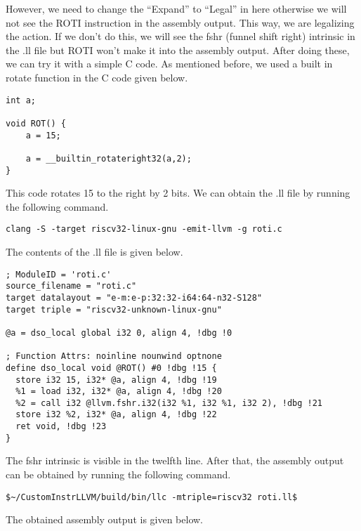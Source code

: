 However, we need to change the “Expand” to “Legal” in here otherwise we will not see the ROTI instruction in the assembly output.  This way, we are legalizing the action. If we don’t do this, we will see the fshr (funnel shift right) intrinsic in the .ll file but ROTI won’t make it into the assembly output. After doing these, we can try it with a simple C code. As mentioned before, we used a built in rotate function in the C code given below. 

\begin{lstlisting}
int a;

void ROT() {
	a = 15;
	
	a = __builtin_rotateright32(a,2);	
}
\end{lstlisting}

This code rotates 15 to the right by 2 bits. We can obtain the .ll file by running the following command.

\begin{lstlisting}
clang -S -target riscv32-linux-gnu -emit-llvm -g roti.c
\end{lstlisting}

The contents of the .ll file is given below.

\begin{lstlisting}
; ModuleID = 'roti.c'
source_filename = "roti.c"
target datalayout = "e-m:e-p:32:32-i64:64-n32-S128"
target triple = "riscv32-unknown-linux-gnu"

@a = dso_local global i32 0, align 4, !dbg !0

; Function Attrs: noinline nounwind optnone
define dso_local void @ROT() #0 !dbg !15 {
  store i32 15, i32* @a, align 4, !dbg !19
  %1 = load i32, i32* @a, align 4, !dbg !20
  %2 = call i32 @llvm.fshr.i32(i32 %1, i32 %1, i32 2), !dbg !21
  store i32 %2, i32* @a, align 4, !dbg !22
  ret void, !dbg !23
}
\end{lstlisting}

The fshr intrinsic is visible in the twelfth line. After that, the assembly output can be obtained by running the following command. 

\begin{lstlisting}
$~/CustomInstrLLVM/build/bin/llc -mtriple=riscv32 roti.ll$
\end{lstlisting}

The obtained assembly output is given below.


